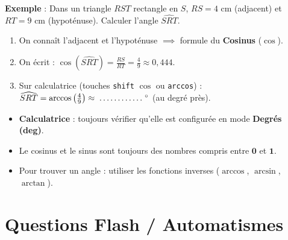 \begin{cadremethode}
\textbf{Exemple} : Dans un triangle $RST$ rectangle en $S$, $RS = 4\text{ cm}$ (adjacent) et $RT = 9\text{ cm}$ (hypoténuse). Calculer l'angle $\widehat{SRT}$.
\begin{enumerate}[leftmargin=1.5em, itemsep=2pt]
    \item On connaît l'adjacent et l'hypoténuse $\implies$ formule du \textbf{Cosinus} ($\cos$).
    \item On écrit : $\cos(\widehat{SRT}) = \frac{RS}{RT} = \frac{4}{9} \approx 0{,}444$.
    \item Sur calculatrice (touches \texttt{shift} $\cos$ ou \texttt{arccos}) : $\widehat{SRT} = \arccos\left(\frac{4}{9}\right) \approx \pointille[2cm]^\circ$ (au degré près).
\end{enumerate}
\end{cadremethode}

\begin{cadreretenu}
\begin{itemize}[leftmargin=1.5em, itemsep=2pt]
    \item \textbf{Calculatrice} : toujours vérifier qu'elle est configurée en mode \textbf{Degrés (deg)}.
    \item Le cosinus et le sinus sont toujours des nombres compris entre $\mathbf{0}$ et $\mathbf{1}$.
    \item Pour trouver un angle : utiliser les fonctions inverses ($\arccos$, $\arcsin$, $\arctan$).
\end{itemize}
\end{cadreretenu}

\newpage

\section{Questions Flash / Automatismes}

